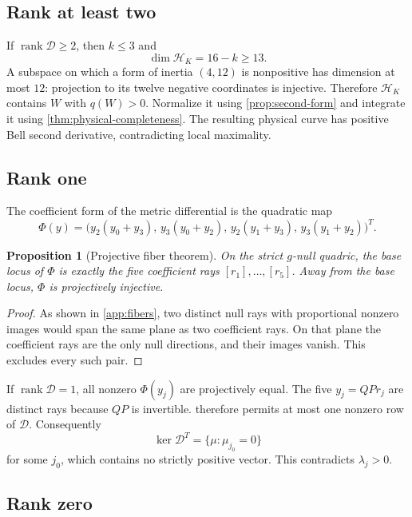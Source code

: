 \documentclass[11pt]{article}
\newtheorem{proposition}[theorem]{Proposition}
\theoremstyle{definition}
\newcommand{\rank}{\operatorname{rank}}
\newcommand{\cD}{\mathcal D}
\begin{document}
\subsection{Rank at least two}

If \(\rank\cD\ge2\), then \(k\le3\) and
\[
\dim\mathcal H_K=16-k\ge13.
\]
A subspace on which a form of inertia \((4,12)\) is nonpositive has dimension
at most \(12\): projection to its twelve negative coordinates is injective.
Therefore \(\mathcal H_K\) contains \(W\) with \(q(W)>0\). Normalize it using
\cref{prop:second-form} and integrate it using
\cref{thm:physical-completeness}. The resulting physical curve has positive
Bell second derivative, contradicting local maximality.

\subsection{Rank one}

The coefficient form of the metric differential is the quadratic map
\[
\Phi(y)=
\bigl(y_2(y_0+y_3),\,y_3(y_0+y_2),\,
y_2(y_1+y_3),\,y_3(y_1+y_2)\bigr)^T.
\]

\begin{proposition}[Projective fiber theorem]
\label{prop:fiber}
On the strict \(g\)-null quadric, the base locus of \(\Phi\) is exactly the
five coefficient rays \([r_1],\ldots,[r_5]\). Away from the base locus,
\(\Phi\) is projectively injective.
\end{proposition}

\begin{proof}
As shown in \cref{app:fibers}, two distinct null rays with proportional
nonzero images would span the same plane as two coefficient rays. On that
plane the coefficient rays are the only null directions, and their images
vanish. This excludes every such pair.
\end{proof}

If \(\rank\cD=1\), all nonzero \(\Phi(y_j)\) are projectively equal.
The five \(y_j=QPr_j\) are distinct rays because \(QP\) is invertible.
 therefore permits at most one nonzero row of \(\cD\).
Consequently
\[
\ker\cD^T=\{\mu:\mu_{j_0}=0\}
\]
for some \(j_0\), which contains no strictly positive vector. This
contradicts \(\lambda_j>0\).

\subsection{Rank zero}
\end{document}

